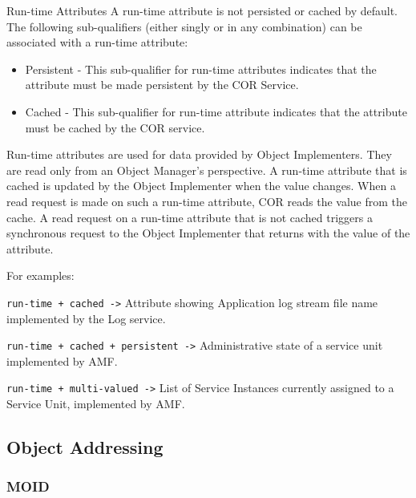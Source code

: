 \begin{flushleft}
\begin{Desc}
\end{Desc}


\begin{Desc}
\item[Run-time Attributes]
A run-time attribute is not persisted or cached by default. The following sub-qualifiers (either singly or in any combination) can be associated with a 
run-time attribute:
\begin{itemize}
\item
Persistent - This sub-qualifier for run-time attributes indicates that the attribute must be made persistent by the COR Service.
\item
Cached - This sub-qualifier for run-time attribute indicates that the attribute must be cached by the COR service.
\end{itemize}
Run-time attributes are used for data provided by Object Implementers. They are read only from an Object Manager's perspective.
A run-time attribute that is cached is updated by the Object Implementer when the value changes. When a read request is made on such a run-time attribute, 
COR reads the value from the cache.
A read request on a run-time attribute that is not cached triggers a synchronous request to the Object Implementer that returns with the value of the
attribute.
\par
For examples:\par
{\tt{run-time + cached ->}} Attribute showing Application log stream file name implemented by the Log service.
\par
{\tt{run-time + cached + persistent ->}} Administrative state of a service unit implemented by AMF.
\par
{\tt{run-time + multi-valued ->}} List of Service Instances currently assigned to a Service Unit, implemented by AMF.

\end{Desc}

\subsection{Object Addressing}
\subsubsection{MOID}


\end{flushleft}
